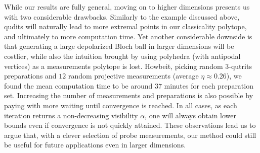 	While our results are fully general, moving on to higher dimensions presents us with two considerable drawbacks. Similarly to the example discussed above, qudits will naturally lead to more extremal points in our classicality polytope, and ultimately to more computation time. Yet another considerable downside is that generating a large depolarized Bloch ball in larger dimensions will be costlier, while also the intuition brought by using polyhedra (with antipodal vertices) as a measurements polytope is lost. Howbeit, picking random $3$-qutrits preparations and $12$ random projective measurements (average $\eta \approx 0.26$), we found the mean computation time to be around $37$ minutes for each preparation set. Increasing the number of measurements and preparations is also possible by paying with more waiting until convergence is reached. In all cases, as each iteration returns a non-decreasing visibility $\alpha$, one will always obtain lower bounds even if convergence is not quickly attained. These observations lead us to argue that, with a clever selection of probe measurements, our method could still be useful for future applications even in larger dimensions.